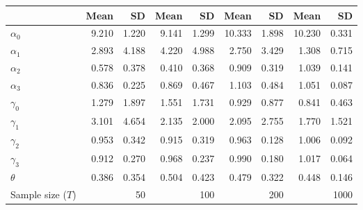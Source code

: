 
\begin{tabular}[t]{lrrrrrrrr}
\toprule
  & Mean & SD & Mean  & SD  & Mean   & SD   & Mean    & SD   \\
\midrule
$\alpha_{0}$ & 9.210 & 1.220 & 9.141 & 1.299 & 10.333 & 1.898 & 10.230 & 0.331\\
$\alpha_{1}$ & 2.893 & 4.188 & 4.220 & 4.988 & 2.750 & 3.429 & 1.308 & 0.715\\
$\alpha_{2}$ & 0.578 & 0.378 & 0.410 & 0.368 & 0.909 & 0.319 & 1.039 & 0.141\\
$\alpha_{3}$ & 0.836 & 0.225 & 0.869 & 0.467 & 1.103 & 0.484 & 1.051 & 0.087\\
$\gamma_{0}$ & 1.279 & 1.897 & 1.551 & 1.731 & 0.929 & 0.877 & 0.841 & 0.463\\
$\gamma_{1}$ & 3.101 & 4.654 & 2.135 & 2.000 & 2.095 & 2.755 & 1.770 & 1.521\\
$\gamma_{2}$ & 0.953 & 0.342 & 0.915 & 0.319 & 0.963 & 0.128 & 1.006 & 0.092\\
$\gamma_{3}$ & 0.912 & 0.270 & 0.968 & 0.237 & 0.990 & 0.180 & 1.017 & 0.064\\
$\theta$ & 0.386 & 0.354 & 0.504 & 0.423 & 0.479 & 0.322 & 0.448 & 0.146\\
Sample size ($T$) &  & 50 &  & 100 &  & 200 &  & 1000\\
\bottomrule
\end{tabular}
